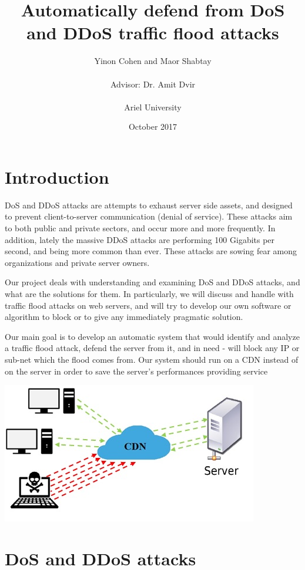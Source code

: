 \documentclass{report}
\title{Automatically defend from DoS and DDoS traffic flood attacks}
\author{Yinon Cohen and Maor Shabtay\\\\{ Advisor: Dr. Amit Dvir}\\\\{Ariel University}}
\date{October 2017}
\begin{document}
\maketitle

\tableofcontents
{}


\newpage

\chapter {Introduction}
\hfill \break DoS and DDoS attacks are attempts to exhaust server side assets, and designed to prevent client-to-server communication (denial of service). These attacks aim to both public and private sectors, and occur more and more frequently. In addition, lately the massive DDoS attacks are performing 100 Gigabits per second, and being more common than ever. These attacks are sowing fear among organizations and private server owners.

\hfill \break Our project deals with understanding and examining DoS and DDoS attacks, and what are the solutions for them. In particularly, we will discuss and handle with traffic flood attacks on web servers, and will try to develop our own software or algorithm to block or to give any immediately pragmatic solution.

\hfill \break Our main goal is to develop an automatic system that would identify and analyze a traffic flood attack, defend the server from it, and in need - will block any IP or sub-net which the flood comes from. Our system should run on a CDN instead of on the server in order to save the server’s performances providing service
\hfill \break \hfill \break
    \begin{center}
        \includegraphics{pi}
    \end{center}
\newpage
\chapter {DoS and DDoS attacks}
\end{document}
